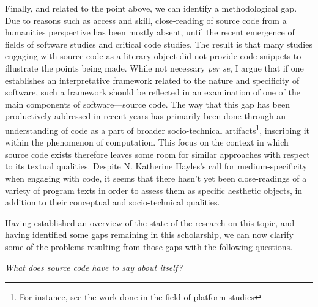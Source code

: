 Finally, and related to the point above, we can identify a methodological gap. Due to reasons such as access and skill, close-reading of source code from a humanities perspective has been mostly absent, until the recent emergence of fields of software studies and critical code studies. The result is that many studies engaging with source code as a literary object did not provide code snippets to illustrate the points being made. While not necessary \emph{per se}, I argue that if one establishes an interpretative framework related to the nature and specificity of software, such a framework should be reflected in an examination of one of the main components of software—source code. The way that this gap has been productively addressed in recent years has primarily been done through an understanding of code as a part of broader socio-technical artifacts\footnote{For instance, see the work done in the field of platform studies\cite{montfort_10_2014}}, inscribing it within the phenomenon of computation. This focus on the context in which source code exists therefore leaves some room for similar approaches with respect to its textual qualities. Despite N. Katherine Hayles's call for medium-specificity when engaging with code\cite{hayles_print_2004}, it seems that there hasn't yet been close-readings of a variety of program texts in order to assess them as specific aesthetic objects, in addition to their conceptual and socio-technical qualities.

Having established an overview of the state of the research on this topic, and having identified some gaps remaining in this scholarship, we can now clarify some of the problems resulting from those gaps with the following questions.

\vspace*{1\baselineskip}

\emph{What does source code have to say about itself?}

